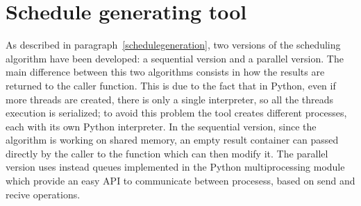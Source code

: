 \documentclass[a4paper,11pt,oneside]{book}
\begin{document}
\section{Schedule generating tool}

As described in paragraph~\ref{schedulegeneration}, two versions of the scheduling algorithm have been developed: a sequential version and a parallel version. The main difference between this two algorithms consists in how the results are returned to the caller function. This is due to the fact that in Python, even if more threads are created, there is only a single interpreter, so all the threads execution is serialized; to avoid this problem the tool creates different processes, each with its own Python interpreter. In the sequential version, since the algorithm is working on shared memory, an empty result container can passed directly by the caller to the function which can then modify it. The parallel version uses instead queues implemented in the Python multiprocessing module which provide an easy API to communicate between procesess, based on send and recive operations. 
\end{document}
